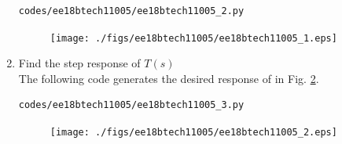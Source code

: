 \begin{enumerate}[label=\arabic*.,ref=\theenumi]
\begin{lstlisting}
codes/ee18btech11005/ee18btech11005_2.py
\end{lstlisting}
\begin{figure}[!ht]
\centering
\texttt{[image: ./figs/ee18btech11005/ee18btech11005\_1.eps]}
\caption{}
\label{fig:ee18btech11005_1}
\end{figure}
\item Find the step response of $T(s)$
\\
\solution The following code generates the desired response of in Fig. \ref{fig:ee18btech11005_2}.
\begin{lstlisting}
codes/ee18btech11005/ee18btech11005_3.py
\end{lstlisting}
%
\begin{figure}[!ht]
\centering
\texttt{[image: ./figs/ee18btech11005/ee18btech11005\_2.eps]}
\caption{}
\label{fig:ee18btech11005_2}
\end{figure}


\end{enumerate}
